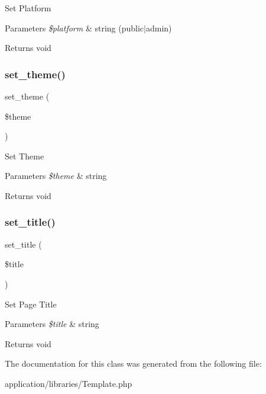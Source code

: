 Set Platform 
\begin{DoxyParams}{Parameters}
{\em \$platform} & string (public$\vert$admin) \\
\hline
\end{DoxyParams}
\begin{DoxyReturn}{Returns}
void 
\end{DoxyReturn}
\mbox{\label{class_template_a51757f768d2afcaa9bc6013adf7d952a}} 
\subsubsection{\texorpdfstring{set\+\_\+theme()}{set\_theme()}}
{\footnotesize\ttfamily set\+\_\+theme (\begin{DoxyParamCaption}\item[{}]{\$theme }\end{DoxyParamCaption})}

Set Theme 
\begin{DoxyParams}{Parameters}
{\em \$theme} & string \\
\hline
\end{DoxyParams}
\begin{DoxyReturn}{Returns}
void 
\end{DoxyReturn}
\mbox{\label{class_template_a77fbf5b705d3f0142f8ba77f8364cf45}} 
\subsubsection{\texorpdfstring{set\+\_\+title()}{set\_title()}}
{\footnotesize\ttfamily set\+\_\+title (\begin{DoxyParamCaption}\item[{}]{\$title }\end{DoxyParamCaption})}

Set Page Title 
\begin{DoxyParams}{Parameters}
{\em \$title} & string \\
\hline
\end{DoxyParams}
\begin{DoxyReturn}{Returns}
void 
\end{DoxyReturn}


The documentation for this class was generated from the following file\+:\begin{DoxyCompactItemize}
\item 
application/libraries/Template.\+php\end{DoxyCompactItemize}
